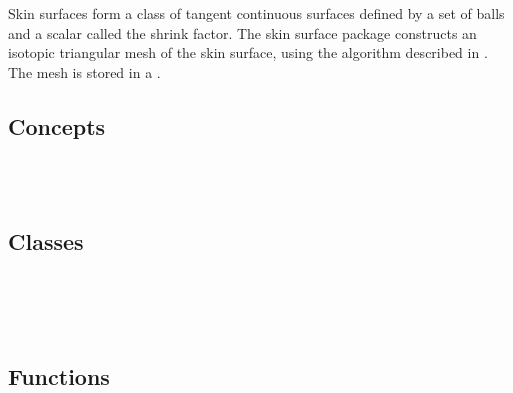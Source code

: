 
\label{chapterSkinSurfaceRef}

Skin surfaces form a class of tangent continuous surfaces defined by a
set of balls and a scalar called the shrink factor. The skin surface
package constructs an isotopic triangular mesh of the skin surface,
using the algorithm described in \cite{cgal:kv-mssct-05}. The mesh is
stored in a . 

\subsection*{Concepts}
\\
\\



\subsection*{Classes}
\\
\\

\\

\subsection*{Functions}
\\
\\


